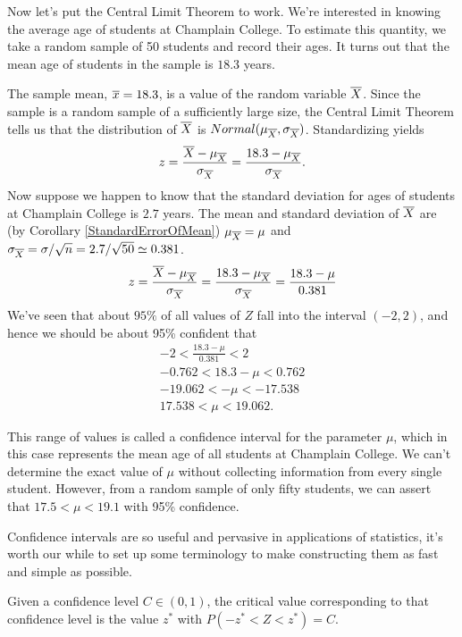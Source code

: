 Now let's put the Central Limit Theorem to work. We're interested in knowing the average age of students at Champlain College. To estimate this quantity, we take a random sample of 50 students and record their ages. It turns out that the mean age of students in the sample is $18.3$ years.
\par
The sample mean, ${\overline{x}} = 18.3$, is a value of the random variable ${\overline{X}}$. Since the sample is a random sample of a sufficiently large size, the Central Limit Theorem tells us that the distribution of ${\overline{X}}$ is $Normal(\mu_{\overline{X}}, \sigma_{\overline{X}})$. Standardizing yields
$$z = \frac{{\overline{X}} - \mu_{\overline{X}}}{\sigma_{\overline{X}}} = \frac{18.3 - \mu_{\overline{X}}}{\sigma_{\overline{X}}}.$$
Now suppose we happen to know that the standard deviation for ages of students at Champlain College is $2.7$ years. The mean and standard deviation of ${\overline{X}}$ are (by Corollary \ref{StandardErrorOfMean}) $\mu_{\overline{X}} = \mu$ and $\sigma_{\overline{X}} = \sigma / \sqrt{n} = 2.7 / \sqrt{50} \simeq 0.381$.
$$z = \frac{{\overline{X}} - \mu_{\overline{X}}}{\sigma_{\overline{X}}} = \frac{18.3 - \mu_{\overline{X}}}{\sigma_{\overline{X}}} = \frac{18.3 - \mu}{0.381}$$
We've seen that about $95\%$ of all values of $Z$ fall into the interval $(-2, 2)$, and hence we should be about 95\% confident that
\begin{gather*}
-2 < \textstyle\frac{18.3 - \mu}{0.381} < 2 \\
-0.762 < 18.3 - \mu < 0.762 \\
-19.062 < - \mu < -17.538 \\
17.538 < \mu < 19.062.
\end{gather*}
\par
This range of values is called a confidence interval for the parameter $\mu$, which in this case represents the mean age of all students at Champlain College. We can't determine the exact value of $\mu$ without collecting information from every single student. However, from a random sample of only fifty students, we can assert that $17.5 < \mu < 19.1$ with 95\% confidence.
\par
Confidence intervals are so useful and pervasive in applications of statistics, it's worth our while to set up some terminology to make constructing them as fast and simple as possible.
\par
\begin{defn}Given a confidence level $C \in (0,1)$, the critical value corresponding to that confidence level is the value $z^*$ with $P(-z^* < Z < z^*) = C$.
\end{defn}
\begin{center}
\end{center}
